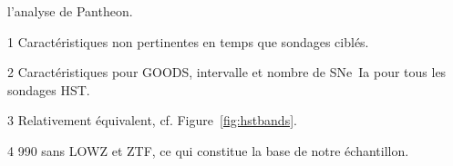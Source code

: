 \documentclass[../main/main.tex]{subfiles}
\begin{document}
\begin{table}[ht]
\begin{threeparttable}
\begin{tablenotes}[flushleft]
            l'analyse de Pantheon.
        \item [1] \small  Caractéristiques non pertinentes en temps que sondages
            ciblés.
        \item [2] \small Caractéristiques pour GOODS, intervalle et nombre de
            SNe~Ia pour tous les sondages HST.
        \item [3] \small Relativement équivalent, cf. Figure~\ref{fig:hstbands}.
        \item [4] \small 990 sans LOWZ et ZTF, ce qui constitue la base de notre
            échantillon.
        \end{tablenotes}
    \end{threeparttable}
\end{table}
\shorthandon{:}
\vfill

\newpage

\thispagestyle{plain}
\vfill
\minilof
\vfill
\minilot
\vfill

% 
% 
\end{document}
